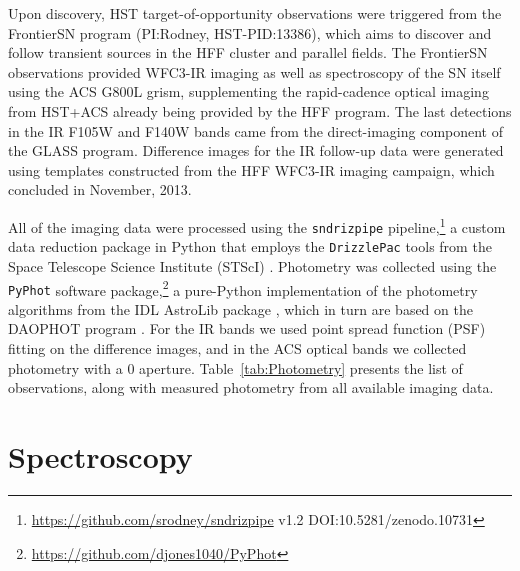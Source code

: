 Upon discovery, HST target-of-opportunity observations were triggered
from the FrontierSN program (PI:Rodney, HST-PID:13386), which aims to
discover and follow transient sources in the HFF cluster and parallel
fields. The FrontierSN observations provided WFC3-IR imaging as well
as spectroscopy of the SN itself using the ACS G800L grism,
supplementing the rapid-cadence optical imaging from HST+ACS already
being provided by the HFF program. The last detections in the IR F105W
and F140W bands came from the direct-imaging component of the GLASS
program.  Difference images for the IR follow-up data were generated
using templates constructed from the HFF WFC3-IR imaging campaign,
which concluded in November, 2013.

All of the imaging data were processed using the {\tt sndrizpipe}
pipeline,\footnote{\url{https://github.com/srodney/sndrizpipe} v1.2
DOI:10.5281/zenodo.10731} a custom data reduction package in Python
that employs the {\tt DrizzlePac} tools from the Space Telescope
Science Institute (STScI) \citep{Fruchter:2010}.  Photometry was
collected using the {\tt PyPhot} software
package,\footnote{\url{https://github.com/djones1040/PyPhot}} a
pure-Python implementation of the photometry algorithms from the IDL
AstroLib package \citep{Landsman:1993}, which in turn are based on the
DAOPHOT program \citep{Stetson:1987}.  For the IR bands we used point
spread function (PSF) fitting on the difference images, and in the ACS
optical bands we collected photometry with a
0 aperture. Table~\ref{tab:Photometry} presents the list of
observations, along with measured photometry from all available
imaging data.
 


\section{Spectroscopy}
\label{sec:Spectroscopy}

